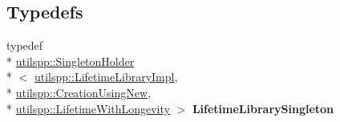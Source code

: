 \subsection*{Typedefs}
\begin{DoxyCompactItemize}
\item 
\hypertarget{namespaceutilspp_ab87206e35c4f01efde56c18188a48241}{typedef \\*
\hyperlink{classutilspp_1_1SingletonHolder}{utilspp\-::\-Singleton\-Holder}\\*
$<$ \hyperlink{classutilspp_1_1LifetimeLibraryImpl}{utilspp\-::\-Lifetime\-Library\-Impl}, \\*
\hyperlink{structutilspp_1_1CreationUsingNew}{utilspp\-::\-Creation\-Using\-New}, \\*
\hyperlink{structutilspp_1_1LifetimeWithLongevity}{utilspp\-::\-Lifetime\-With\-Longevity} $>$ {\bfseries Lifetime\-Library\-Singleton}}\label{namespaceutilspp_ab87206e35c4f01efde56c18188a48241}

\end{DoxyCompactItemize}
